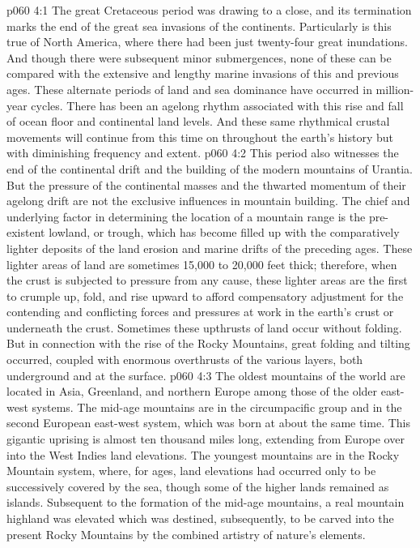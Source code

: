 \vs p060 4:1 The great Cretaceous period was drawing to a close, and its termination marks the end of the great sea invasions of the continents. Particularly is this true of North America, where there had been just twenty\hyp{}four great inundations. And though there were subsequent minor submergences, none of these can be compared with the extensive and lengthy marine invasions of this and previous ages. These alternate periods of land and sea dominance have occurred in million\hyp{}year cycles. There has been an agelong rhythm associated with this rise and fall of ocean floor and continental land levels. And these same rhythmical crustal movements will continue from this time on throughout the earth’s history but with diminishing frequency and extent.
\vs p060 4:2 This period also witnesses the end of the continental drift and the building of the modern mountains of Urantia. But the pressure of the continental masses and the thwarted momentum of their agelong drift are not the exclusive influences in mountain building. The chief and underlying factor in determining the location of a mountain range is the pre\hyp{}existent lowland, or trough, which has become filled up with the comparatively lighter deposits of the land erosion and marine drifts of the preceding ages. These lighter areas of land are sometimes 15,000 to 20,000 feet thick; therefore, when the crust is subjected to pressure from any cause, these lighter areas are the first to crumple up, fold, and rise upward to afford compensatory adjustment for the contending and conflicting forces and pressures at work in the earth’s crust or underneath the crust. Sometimes these upthrusts of land occur without folding. But in connection with the rise of the Rocky Mountains, great folding and tilting occurred, coupled with enormous overthrusts of the various layers, both underground and at the surface.
\vs p060 4:3 \pc The oldest mountains of the world are located in Asia, Greenland, and northern Europe among those of the older east\hyp{}west systems. The mid\hyp{}age mountains are in the circumpacific group and in the second European east\hyp{}west system, which was born at about the same time. This gigantic uprising is almost ten thousand miles long, extending from Europe over into the West Indies land elevations. The youngest mountains are in the Rocky Mountain system, where, for ages, land elevations had occurred only to be successively covered by the sea, though some of the higher lands remained as islands. Subsequent to the formation of the mid\hyp{}age mountains, a real mountain highland was elevated which was destined, subsequently, to be carved into the present Rocky Mountains by the combined artistry of nature’s elements.
